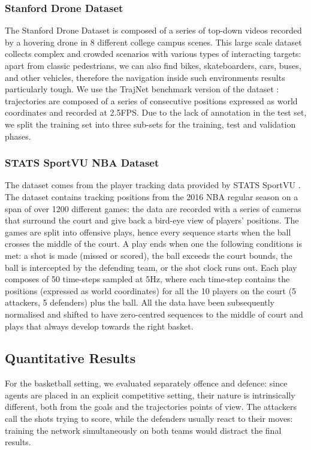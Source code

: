 \documentclass[10pt,a4paper,conference]{IEEEtran}
\begin{document}
\subsubsection{Stanford Drone Dataset}
The Stanford Drone Dataset \cite{sdd} is composed of a series of top-down videos recorded by a hovering drone in 8 different college campus scenes. This large scale dataset collects complex and crowded scenarios with various types of interacting targets: apart from classic pedestrians, we can also find bikes, skateboarders, cars, buses, and other vehicles, therefore the navigation inside such environments results particularly tough. We use the TrajNet benchmark version of the dataset \cite{trajnet2018}: trajectories are composed of a series of consecutive positions expressed as  world coordinates and recorded at 2.5FPS. Due to the lack of annotation in the test set, we split the training set into three sub-sets for the training, test and validation phases.


\subsubsection{STATS SportVU NBA Dataset}
The dataset comes from the player tracking data provided by STATS SportVU \cite{stats_sportvu}. The dataset contains tracking positions from the 2016 NBA regular season on a span of over 1200 different games: the data are recorded with a series of cameras that surround the court and give back a bird-eye view of players' positions. The games are split into offensive plays, hence every sequence starts when the ball crosses the middle of the court. A play ends when one the following conditions is met: a shot is made (missed or scored), the ball exceeds the court bounds, the ball is intercepted by the defending team, or the shot clock runs out. Each play composes of 50 time-steps sampled at 5Hz, where each time-step contains the positions (expressed as  world coordinates) for all the 10 players on the court (5 attackers, 5 defenders) plus the ball. All the data have been subsequently normalised and shifted to have zero-centred sequences to the middle of court and plays that always develop towards the right basket.






\subsection{Quantitative Results}
For the basketball setting, we evaluated separately offence and defence: since agents are placed in an explicit competitive setting, their nature is intrinsically different, both from the goals and the trajectories points of view. The attackers call the shots trying to score, while the defenders usually react to their moves: training the network simultaneously on both teams would distract the final results. 
\end{document}
